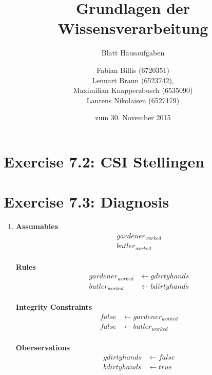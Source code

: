 \documentclass[a4paper]{scrartcl}
\title{Grundlagen der Wissensverarbeitung}
\subtitle{Blatt {\blattnr} Hausaufgaben}
\author{
    Fabian Billis (6720351) \\
    Lennart Braun (6523742), \\
    Maximilian Knapperzbusch (6535090) \\
    Laurens Nikolaisen (6527179) \\
}
\date{zum 30. November 2015}
\def \blattnr {7}
\begin{document}
\maketitle

\section*{Exercise \blattnr.2: CSI Stellingen}

\section*{Exercise \blattnr.3: Diagnosis}
	\begin{enumerate}
		\item
		\textbf{Assumables} \\
		\begin{align*}
			gardener_{worked} \\
			butler_{worked} \\
		\end{align*}
		
		\textbf{Rules}
		\begin{align*}
			gardener_{worked} &\leftarrow gdirtyhands \\
			butler_{worked} &\leftarrow bdirtyhands \\
		\end{align*}
		
		\textbf{Integrity Constraints}
		\begin{align*}
			false &\leftarrow gardener_{worked} \\
			false &\leftarrow butler_{worked} \\
		\end{align*}
		
		\textbf{Oberservations}
		\begin{align*}
			gdirtyhands &\leftarrow false \\
			bdirtyhands &\leftarrow true \\
		\end{align*}


\end{enumerate}
\end{document}
